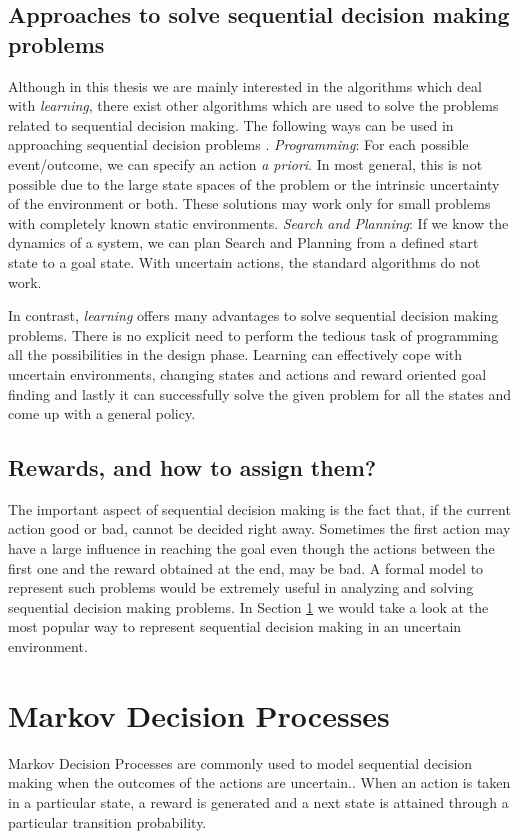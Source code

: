 \documentclass[12pt]{report}
\begin{document}
\subsection{Approaches to solve sequential decision making problems}
Although in this thesis we are mainly interested in the algorithms which deal with \textit{learning}, there exist other algorithms which are used to solve the problems related to sequential decision making. The following ways can be used in approaching sequential decision problems \cite{wiering2012reinforcement}. 
\textit{Programming}: For each possible event/outcome, we can specify an action \textit{a priori}. In most general, this is not possible due to the large state spaces of the problem or the intrinsic uncertainty of the environment or both. These solutions may work only for small problems with completely known static environments. \textit{Search and Planning}: If we know the dynamics of a system, we can plan Search and Planning from a defined start state to a goal state. With uncertain actions, the standard algorithms do not work.\par 
In contrast, \textit{learning} offers many advantages to solve sequential decision making problems. There is no explicit need to perform the tedious task of programming all the possibilities in the design phase. Learning can effectively cope with uncertain environments, changing states and actions and reward oriented goal finding and lastly it can successfully solve the given problem for all the states and come up with a general policy. 

\subsection{Rewards, and how to assign them?}
The important aspect of sequential decision making is the fact that, if the current action good or bad, cannot be decided right away. Sometimes the first action may have a large influence in reaching the goal even though the actions between the first one and the reward obtained at the end, may be bad. A formal model to represent such problems would be extremely useful in analyzing and solving sequential decision making problems. In Section \ref{mdp} we would take a look at the most popular way to represent sequential decision making in an uncertain environment.

\section{Markov Decision Processes}
\label{mdp}
Markov Decision Processes are commonly used to model sequential decision making when the outcomes of the actions are uncertain.\cite{puterman2014markov}. When an action is taken in a particular state, a reward is generated and a next state is attained through a particular transition probability.
\end{document}
